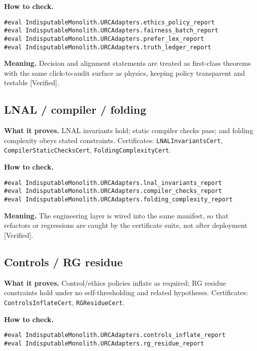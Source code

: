 \documentclass[11pt,a4paper,twoside]{article}
\numberwithin{equation}{section}
\theoremstyle{customthm}
\theoremstyle{customdef}
\theoremstyle{customrem}
\begin{document}
\textbf{How to check.}

\begin{lstlisting}
#eval IndisputableMonolith.URCAdapters.ethics_policy_report
#eval IndisputableMonolith.URCAdapters.fairness_batch_report
#eval IndisputableMonolith.URCAdapters.prefer_lex_report
#eval IndisputableMonolith.URCAdapters.truth_ledger_report
\end{lstlisting}

\textbf{Meaning.} Decision and alignment statements are treated as first-class theorems with the same click-to-audit surface as physics, keeping policy transparent and testable [Verified].

\subsection{LNAL / compiler / folding}

\textbf{What it proves.} LNAL invariants hold; static compiler checks pass; and folding complexity obeys stated constraints. Certificates: \texttt{LNALInvariantsCert}, \texttt{CompilerStaticChecksCert}, \texttt{FoldingComplexityCert}.

\textbf{How to check.}

\begin{lstlisting}
#eval IndisputableMonolith.URCAdapters.lnal_invariants_report
#eval IndisputableMonolith.URCAdapters.compiler_checks_report
#eval IndisputableMonolith.URCAdapters.folding_complexity_report
\end{lstlisting}

\textbf{Meaning.} The engineering layer is wired into the same manifest, so that refactors or regressions are caught by the certificate suite, not after deployment [Verified].

\subsection{Controls / RG residue}

\textbf{What it proves.} Control/ethics policies inflate as required; RG residue constraints hold under no self-thresholding and related hypotheses. Certificates: \texttt{ControlsInflateCert}, \texttt{RGResidueCert}.

\textbf{How to check.}

\begin{lstlisting}
#eval IndisputableMonolith.URCAdapters.controls_inflate_report
#eval IndisputableMonolith.URCAdapters.rg_residue_report
\end{lstlisting}
\end{document}
